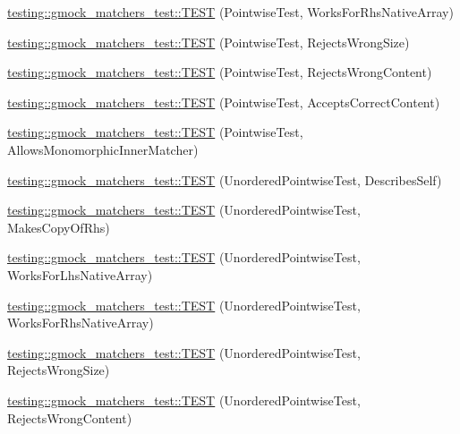 \begin{DoxyCompactItemize}
\item 
\hyperlink{namespacetesting_1_1gmock__matchers__test_adabf6a3ceda0024d630d2ece31e37f7c}{testing\+::gmock\+\_\+matchers\+\_\+test\+::\+T\+E\+ST} (Pointwise\+Test, Works\+For\+Rhs\+Native\+Array)
\item 
\hyperlink{namespacetesting_1_1gmock__matchers__test_a1f73a8fa9dd9560bd606a990444a81fe}{testing\+::gmock\+\_\+matchers\+\_\+test\+::\+T\+E\+ST} (Pointwise\+Test, Rejects\+Wrong\+Size)
\item 
\hyperlink{namespacetesting_1_1gmock__matchers__test_a135ad7162da91c9a234193fbbe5ef775}{testing\+::gmock\+\_\+matchers\+\_\+test\+::\+T\+E\+ST} (Pointwise\+Test, Rejects\+Wrong\+Content)
\item 
\hyperlink{namespacetesting_1_1gmock__matchers__test_a42b98b370f1897cecfafbbfba53f4f38}{testing\+::gmock\+\_\+matchers\+\_\+test\+::\+T\+E\+ST} (Pointwise\+Test, Accepts\+Correct\+Content)
\item 
\hyperlink{namespacetesting_1_1gmock__matchers__test_a9bbef6d651166c37af32c54923bcd849}{testing\+::gmock\+\_\+matchers\+\_\+test\+::\+T\+E\+ST} (Pointwise\+Test, Allows\+Monomorphic\+Inner\+Matcher)
\item 
\hyperlink{namespacetesting_1_1gmock__matchers__test_af3307f88a321331155a146d49974e3e3}{testing\+::gmock\+\_\+matchers\+\_\+test\+::\+T\+E\+ST} (Unordered\+Pointwise\+Test, Describes\+Self)
\item 
\hyperlink{namespacetesting_1_1gmock__matchers__test_a05e9bbee9d19692f45a846c2ff45e016}{testing\+::gmock\+\_\+matchers\+\_\+test\+::\+T\+E\+ST} (Unordered\+Pointwise\+Test, Makes\+Copy\+Of\+Rhs)
\item 
\hyperlink{namespacetesting_1_1gmock__matchers__test_a57e330a5ae600f65d4daa2ed57bbc887}{testing\+::gmock\+\_\+matchers\+\_\+test\+::\+T\+E\+ST} (Unordered\+Pointwise\+Test, Works\+For\+Lhs\+Native\+Array)
\item 
\hyperlink{namespacetesting_1_1gmock__matchers__test_ae75a933b86db4c43a7bec2ffa97692ef}{testing\+::gmock\+\_\+matchers\+\_\+test\+::\+T\+E\+ST} (Unordered\+Pointwise\+Test, Works\+For\+Rhs\+Native\+Array)
\item 
\hyperlink{namespacetesting_1_1gmock__matchers__test_a50412d02c70f8303a087e6832d26ba62}{testing\+::gmock\+\_\+matchers\+\_\+test\+::\+T\+E\+ST} (Unordered\+Pointwise\+Test, Rejects\+Wrong\+Size)
\item 
\hyperlink{namespacetesting_1_1gmock__matchers__test_a9a9a85c6598ab74463703acbd01aa1a7}{testing\+::gmock\+\_\+matchers\+\_\+test\+::\+T\+E\+ST} (Unordered\+Pointwise\+Test, Rejects\+Wrong\+Content)

\end{DoxyCompactItemize}

